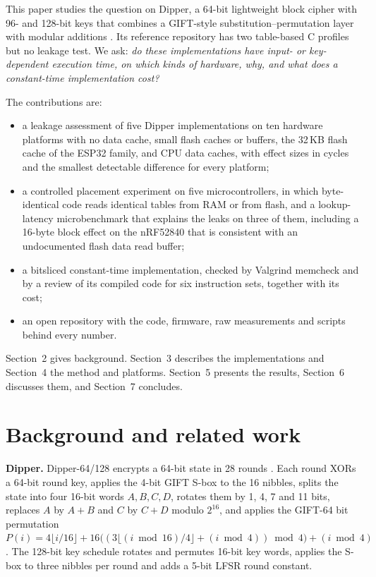\documentclass[11pt, a4paper, twoside, reqno]{article}
\begin{document}
This paper studies the question on Dipper, a 64-bit lightweight block cipher with 96- and 128-bit keys that combines a GIFT-style substitution--permutation layer with modular additions \citep{huseynli2026}. Its reference repository has two table-based C profiles but no leakage test. We ask: \emph{do these implementations have input- or key-dependent execution time, on which kinds of hardware, why, and what does a constant-time implementation cost?}

The contributions are:
\begin{itemize}
\item a leakage assessment of five Dipper implementations on ten hardware platforms with no data cache, small flash caches or buffers, the 32\,KB flash cache of the ESP32 family, and CPU data caches, with effect sizes in cycles and the smallest detectable difference for every platform;
\item a controlled placement experiment on five microcontrollers, in which byte-identical code reads identical tables from RAM or from flash, and a lookup-latency microbenchmark that explains the leaks on three of them, including a 16-byte block effect on the nRF52840 that is consistent with an undocumented flash data read buffer;
\item a bitsliced constant-time implementation, checked by Valgrind memcheck and by a review of its compiled code for six instruction sets, together with its cost;
\item an open repository with the code, firmware, raw measurements and scripts behind every number.
\end{itemize}

Section~2 gives background. Section~3 describes the implementations and Section~4 the method and platforms. Section~5 presents the results, Section~6 discusses them, and Section~7 concludes.

\section{Background and related work}

\textbf{Dipper.} Dipper-64/128 encrypts a 64-bit state in 28 rounds \citep{huseynli2026}. Each round XORs a 64-bit round key, applies the 4-bit GIFT S-box \citep{banik2017} to the 16 nibbles, splits the state into four 16-bit words $A,B,C,D$, rotates them by 1, 4, 7 and 11 bits, replaces $A$ by $A+B$ and $C$ by $C+D$ modulo $2^{16}$, and applies the GIFT-64 bit permutation $P(i)=4\lfloor i/16\rfloor+16\big((3\lfloor (i \bmod 16)/4\rfloor+(i \bmod 4)) \bmod 4\big)+(i \bmod 4)$. The 128-bit key schedule rotates and permutes 16-bit key words, applies the S-box to three nibbles per round and adds a 5-bit LFSR round constant.
\end{document}
